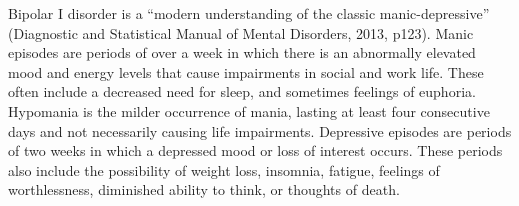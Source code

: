Bipolar I disorder is a “modern understanding of the classic manic-depressive” (Diagnostic and Statistical Manual of Mental Disorders, 2013, p123). Manic episodes are periods of over a week in which there is an abnormally elevated mood and energy levels that cause impairments in social and work life. These often include a decreased need for sleep, and sometimes feelings of euphoria. Hypomania is the milder occurrence of mania, lasting at least four consecutive days and not necessarily causing life impairments. Depressive episodes are periods of two weeks in which a depressed mood or loss of interest occurs. These periods also include the possibility of weight loss, insomnia, fatigue, feelings of worthlessness, diminished ability to think, or thoughts of death.